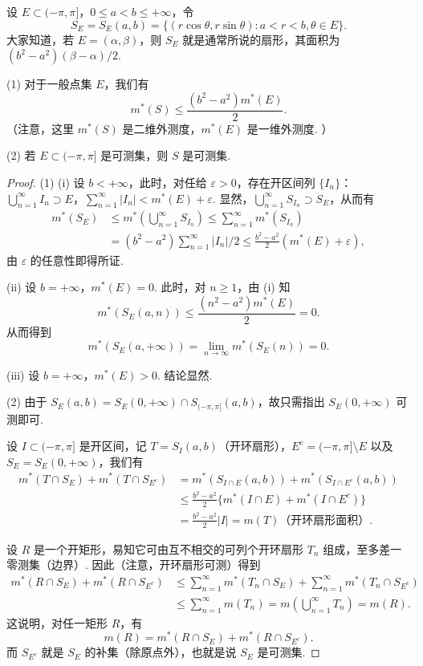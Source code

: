 \documentclass[../../main.tex]{subfiles}
\begin{document}
\begin{example}\label{example:极坐标变换与可测性}
设 \(E \subset (-\pi, \pi]\)，\(0 \leqslant a < b \leqslant +\infty\)，令
\[
S_E = S_E(a,b)=\{(r\cos\theta, r\sin\theta): a < r < b, \theta \in E\}.
\]
大家知道，若 \(E = (\alpha, \beta)\)，则 \(S_E\) 就是通常所说的扇形，其面积为 \((b^2 - a^2)(\beta - \alpha)/2\).

(1) 对于一般点集 \(E\)，我们有
\[
m^*(S) \leqslant \frac{(b^2 - a^2)m^*(E)}{2}.
\]
（注意，这里 \(m^*(S)\) 是二维外测度，\(m^*(E)\) 是一维外测度. ）

(2) 若 \(E \subset (-\pi, \pi]\) 是可测集，则 \(S\) 是可测集.
\end{example}
\begin{proof}
(1) (i) 设 \(b < +\infty\)，此时，对任给 \(\varepsilon > 0\)，存在开区间列 \(\{I_n\}\)：\(\bigcup_{n = 1}^{\infty} I_n \supset E\)，\(\sum_{n = 1}^{\infty}|I_n| < m^*(E) + \varepsilon\). 显然，\(\bigcup_{n = 1}^{\infty} S_{I_n} \supset S_E\)，从而有
\begin{align*}
m^*(S_E) &\leqslant m^*\left(\bigcup_{n = 1}^{\infty} S_{I_n}\right) \leqslant \sum_{n = 1}^{\infty}m^*(S_{I_n})\\
&= (b^2 - a^2)\sum_{n = 1}^{\infty}|I_n|/2 \leqslant \frac{b^2 - a^2}{2}(m^*(E) + \varepsilon),
\end{align*}
由 \(\varepsilon\) 的任意性即得所证.

(ii) 设 \(b = +\infty\)，\(m^*(E) = 0\). 此时，对 \(n \geqslant 1\)，由 (i) 知
\[
m^*(S_E(a,n)) \leqslant \frac{(n^2 - a^2)m^*(E)}{2} = 0.
\]
从而得到
\[
m^*(S_E(a, +\infty)) = \lim_{n \to \infty}m^*(S_E(n)) = 0.
\]

(iii) 设 \(b = +\infty\)，\(m^*(E) > 0\). 结论显然.

(2) 由于 \(S_E(a,b) = S_E(0, +\infty) \cap S_{(-\pi, \pi]}(a,b)\)，故只需指出 \(S_E(0, +\infty)\) 可测即可.

设 \(I \subset (-\pi, \pi]\) 是开区间，记 \(T = S_I(a,b)\)（开环扇形），\(E^c = (-\pi, \pi] \setminus E\) 以及 \(S_E = S_E(0, +\infty)\)，我们有
\begin{align*}
m^*(T \cap S_E) + m^*(T \cap S_{E^c}) 
&= m^*(S_{I \cap E}(a,b)) + m^*(S_{I \cap E^c}(a,b))\\
&\leqslant \frac{b^2 - a^2}{2}\{m^*(I \cap E) + m^*(I \cap E^c)\}\\
&= \frac{b^2 - a^2}{2}|I| = m(T) \text{（开环扇形面积）}.
\end{align*}

设 \(R\) 是一个开矩形，易知它可由互不相交的可列个开环扇形 \(T_n\) 组成，至多差一零测集（边界）. 因此（注意，开环扇形可测）得到
\begin{align*}
m^*(R \cap S_E) + m^*(R \cap S_{E^c}) 
&\leqslant \sum_{n = 1}^{\infty}m^*(T_n \cap S_E) + \sum_{n = 1}^{\infty}m^*(T_n \cap S_{E^c})\\
&\leqslant \sum_{n = 1}^{\infty}m(T_n) = m\left(\bigcup_{n = 1}^{\infty} T_n\right) = m(R).
\end{align*}
这说明，对任一矩形 \(R\)，有
\[
m(R) = m^*(R \cap S_E) + m^*(R \cap S_{E^c}).
\]
而 \(S_{E^c}\) 就是 \(S_E\) 的补集（除原点外），也就是说 \(S_E\) 是可测集. 

\end{proof}
\end{document}
